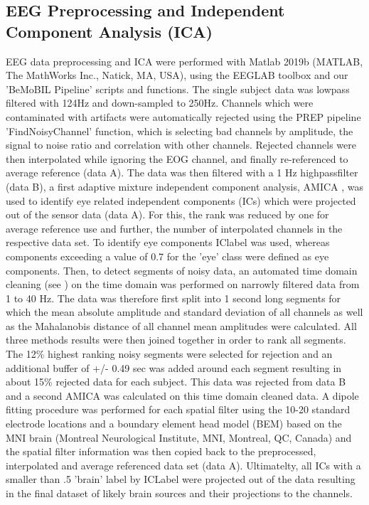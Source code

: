 \subsection{EEG Preprocessing and Independent Component Analysis (ICA)}
EEG data preprocessing and ICA were performed with Matlab 2019b (MATLAB, The MathWorks Inc., Natick, MA, USA), using the EEGLAB toolbox \cite{delorme_eeglab:_2004} and our 'BeMoBIL Pipeline' \cite{klug2018bemobil} scripts and functions. The single subject data was lowpass filtered with 124Hz and down-sampled to 250Hz. Channels which were contaminated with artifacts were automatically rejected using the PREP pipeline \cite{bigdely-shamlo_prep_2015} 'FindNoisyChannel' function, which is selecting bad channels by amplitude, the signal to noise ratio and correlation with other channels. Rejected channels were then interpolated while ignoring the EOG channel, and finally re-referenced to average reference (data A). The data was then filtered with a 1 Hz highpassfilter (data B), a first adaptive mixture independent component analysis, AMICA \cite{palmer_newton_2008}, was used to identify eye related independent components (ICs) which were projected out of the sensor data (data A). For this, the rank was reduced by one for average reference use and further, the number of interpolated channels in the respective data set. To identify eye components IClabel  \cite{pion2019iclabel} was used, whereas components exceeding a value of 0.7 for the 'eye' class were defined as eye components. Then, to detect segments of noisy data, an automated time domain cleaning (see \citet{gramann2018heading}) on the time domain was performed on narrowly filtered data from 1 to 40 Hz. The data was therefore first split into 1 second long segments for which the mean absolute amplitude and standard deviation of all channels as well as the Mahalanobis distance of all channel mean amplitudes were calculated. All three methods results were then joined together in order to rank all segments. The 12\% highest ranking noisy segments were selected for rejection and an additional buffer of +/- 0.49 sec was added around each segment resulting in about 15\% rejected data for each subject. This data was rejected from data B and a second AMICA was calculated on this time domain cleaned data. A dipole fitting \cite{oostenveld2002validating} procedure was performed for each spatial filter using the 10-20 standard electrode locations and a boundary element head model (BEM) based on the MNI brain (Montreal Neurological Institute, MNI, Montreal, QC, Canada) and the spatial filter information was then copied back to the preprocessed, interpolated and average referenced data set (data A). Ultimatelty, all ICs with a smaller than .5 'brain' label by ICLabel were projected out of the data resulting in the final dataset of likely brain sources and their projections to the channels.

